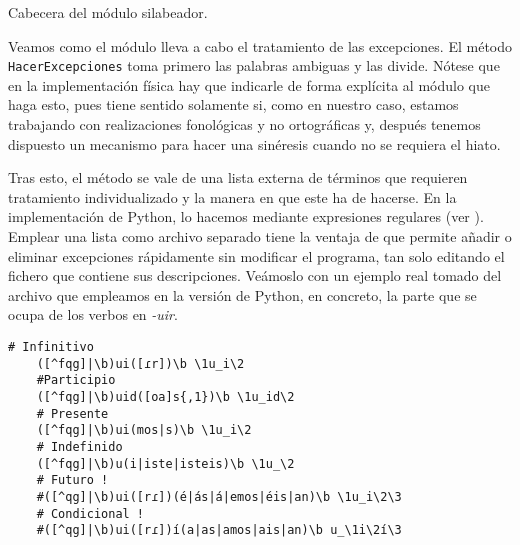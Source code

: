 \begin{algorithm}[!ht] %
	\caption{Cabecera del módulo silabeador.}\label{list:silabeador1}
		
	\SetKwData{}{}\SetKwData{}{}\SetKwData{}{}\SetKwData{}{}\SetKwData{}{}\SetKwData{}{}
\end{algorithm}

Veamos como el módulo lleva a cabo el tratamiento de las excepciones.  El método \texttt{HacerExcepciones} toma primero las palabras ambiguas \parencite{dominguez2012} y las divide. Nótese que en la implementación física hay que indicarle de forma explícita al módulo que haga esto, pues tiene sentido solamente si, como en nuestro caso, estamos trabajando con realizaciones fonológicas y no ortográficas y, después tenemos dispuesto un mecanismo para hacer una sinéresis cuando no se requiera el hiato.

Tras esto, el método se vale de una lista externa de términos que requieren tratamiento individualizado y la manera en que este ha de hacerse. En la implementación de Python, lo hacemos mediante expresiones regulares (ver ). Emplear una lista como archivo separado tiene la ventaja de que permite añadir o eliminar excepciones rápidamente sin modificar el programa, tan solo editando el fichero que contiene sus descripciones. Veámoslo con un ejemplo real tomado del archivo que empleamos en la versión de Python, en concreto, la parte que se ocupa de los verbos en \textit{-uir}.

\begin{Verbatim}[fontsize=\footnotesize,xleftmargin=5ex]
	# Infinitivo
	([^fqg]|\b)ui([ɾr])\b \1u_i\2
	#Participio                              
	([^fqg]|\b)uid([oa]s{,1})\b \1u_id\2
	# Presente
	([^fqg]|\b)ui(mos|s)\b \1u_i\2
	# Indefinido
	([^fqg]|\b)u(i|iste|isteis)\b \1u_\2
	# Futuro !
	#([^qg]|\b)ui([rɾ])(é|ás|á|emos|éis|an)\b \1u_i\2\3
	# Condicional !
	#([^qg]|\b)ui([rɾ])í(a|as|amos|ais|an)\b u_\1i\2í\3
\end{Verbatim}

